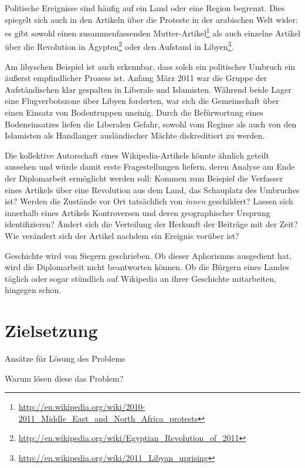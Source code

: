 Politische Ereignisse sind häufig auf ein Land oder eine Region begrenzt.
Dies spiegelt sich auch in den Artikeln über die Proteste in der arabischen Welt wider: es gibt sowohl einen zusammenfassenden \glqq Mutter-Artikel\grqq\footnote{\url{http://en.wikipedia.org/wiki/2010-2011_Middle_East_and_North_Africa_protests}} als auch einzelne Artikel über die Revolution in Ägypten\footnote{\url{http://en.wikipedia.org/wiki/Egyptian_Revolution_of_2011}} oder den Aufstand in Libyen\footnote{\url{http://en.wikipedia.org/wiki/2011_Libyan_uprising}}.

Am libyschen Beispiel ist auch erkennbar, dass solch ein politischer Umbruch ein äußerst empfindlicher Prozess ist.
Anfang März 2011 war die Gruppe der Aufständischen klar gespalten in Liberale und Islamisten.
Während beide Lager eine Flugverbotszone über Libyen forderten, war sich die Gemeinschaft über einen Einsatz von Bodentruppen uneinig.
Durch die Befürwortung eines Bodeneinsatzes liefen die Liberalen Gefahr, sowohl vom Regime als auch von den Islamisten als Handlanger ausländischer Mächte diskreditiert zu werden.\cite{econ18290470}

Die kollektive Autorschaft eines Wikipedia-Artikels könnte ähnlich geteilt aussehen und würde damit erste Fragestellungen liefern, deren Analyse am Ende der Diplomarbeit ermöglicht werden soll:  
Kommen zum Beispiel die Verfasser eines Artikels über eine Revolution aus dem Land, das Schauplatz des Umbruches ist? 
Werden die Zustände vor Ort tatsächlich von \emph{innen} geschildert?
Lassen sich innerhalb eines Artikels Kontroversen und deren geographischer Ursprung identifizieren?
Ändert sich die Verteilung der Herkunft der Beiträge mit der Zeit? 
Wie verändert sich der Artikel nachdem ein Ereignis vorüber ist?

Geschichte wird von Siegern geschrieben. 
Ob dieser Aphorismus ausgedient hat, wird die Diplomarbeit nicht beantworten können.
Ob die Bürgern eines Landes täglich oder sogar stündlich auf Wikipedia an ihrer Geschichte mitarbeiten, hingegen schon.


\section{Zielsetzung}

\begin{todos}
    \item Ansätze für Lösung des Problems
    \item Warum lösen diese das Problem?
\end{todos}

